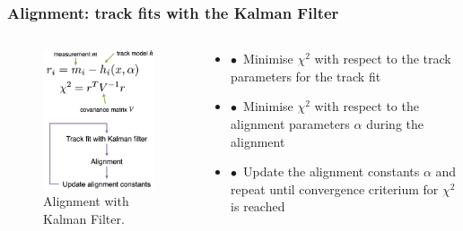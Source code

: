 \documentclass[aspectratio=1610, 12pt]{beamer}
\begin{document}
\begin{frame}\frametitle{Alignment: track fits with the Kalman Filter}
  \begin{columns}
    \begin{column}[c]{0.48\textwidth}
      \begin{figure}
        \centering
        \includegraphics[width=\columnwidth]{logos/kalman.png}
        \caption{Alignment with Kalman Filter.}
      \end{figure}
    \end{column}
    \begin{column}[c]{0.48\textwidth}
      \begin{itemize}
        \item $\bullet$\, Minimise $\chi^2$ with respect to the track parameters for the track fit
        \item $\bullet$\, Minimise $\chi^2$ with respect to the alignment parameters $\alpha$ during the alignment
        \item $\bullet$\, Update the alignment constants $\alpha$ and repeat until convergence criterium for $\chi^2$ is reached
      \end{itemize}
    \end{column}
  \end{columns}
\end{frame}
\end{document}
